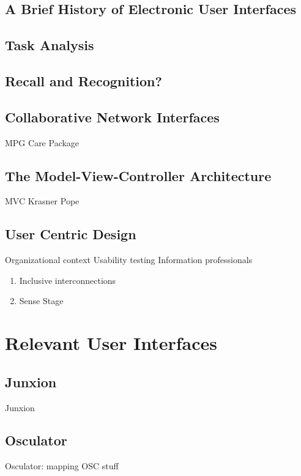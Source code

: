	\subsection{A Brief History of Electronic User Interfaces}
	\subsection{Task Analysis}
	\subsection{Recall and Recognition?}
	\subsection{Collaborative Network Interfaces}
		MPG Care Package 
	\subsection{The Model-View-Controller Architecture}
		MVC Krasner Pope 
	\subsection{User Centric Design}
		Organizational context 
		Usability testing 
		Information professionals 
	\begin{enumerate}
		\item Inclusive interconnections 
		\item Sense Stage 
	\end{enumerate}

			\section{Relevant User Interfaces}

	\subsection{Junxion}
		Junxion 
	\subsection{Osculator}
		Osculator: mapping OSC stuff 
